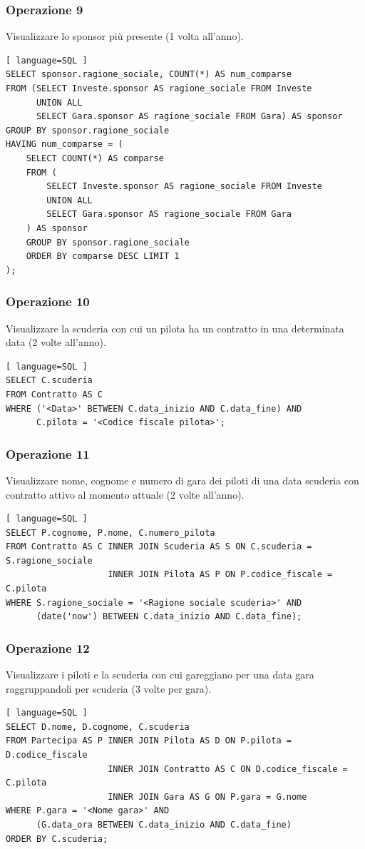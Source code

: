 \documentclass[11pt]{article}
\begin{document}
\subsubsection{Operazione 9}
Visualizzare lo sponsor più presente (1 volta all'anno).
\begin{lstlisting}[ language=SQL ]
SELECT sponsor.ragione_sociale, COUNT(*) AS num_comparse
FROM (SELECT Investe.sponsor AS ragione_sociale FROM Investe 
      UNION ALL 
      SELECT Gara.sponsor AS ragione_sociale FROM Gara) AS sponsor
GROUP BY sponsor.ragione_sociale
HAVING num_comparse = (
    SELECT COUNT(*) AS comparse
    FROM (
        SELECT Investe.sponsor AS ragione_sociale FROM Investe 
        UNION ALL 
        SELECT Gara.sponsor AS ragione_sociale FROM Gara
    ) AS sponsor
    GROUP BY sponsor.ragione_sociale
    ORDER BY comparse DESC LIMIT 1
);
\end{lstlisting}


\subsubsection{Operazione 10}
Visualizzare la scuderia con cui un pilota ha un contratto in una determinata data (2 volte all'anno).
\begin{lstlisting}[ language=SQL ]
SELECT C.scuderia
FROM Contratto AS C
WHERE ('<Data>' BETWEEN C.data_inizio AND C.data_fine) AND
      C.pilota = '<Codice fiscale pilota>';
\end{lstlisting}


\subsubsection{Operazione 11}
Visualizzare nome, cognome e numero di gara dei piloti di una data scuderia con contratto attivo al momento attuale (2 volte all'anno).
\begin{lstlisting}[ language=SQL ]
SELECT P.cognome, P.nome, C.numero_pilota
FROM Contratto AS C INNER JOIN Scuderia AS S ON C.scuderia = S.ragione_sociale 
                    INNER JOIN Pilota AS P ON P.codice_fiscale = C.pilota
WHERE S.ragione_sociale = '<Ragione sociale scuderia>' AND
      (date('now') BETWEEN C.data_inizio AND C.data_fine);
\end{lstlisting}


\subsubsection{Operazione 12}
Visualizzare i piloti e la scuderia con cui gareggiano per una data gara raggruppandoli per scuderia (3 volte per gara).
\begin{lstlisting}[ language=SQL ]
SELECT D.nome, D.cognome, C.scuderia
FROM Partecipa AS P INNER JOIN Pilota AS D ON P.pilota = D.codice_fiscale
                    INNER JOIN Contratto AS C ON D.codice_fiscale = C.pilota
                    INNER JOIN Gara AS G ON P.gara = G.nome
WHERE P.gara = '<Nome gara>' AND
      (G.data_ora BETWEEN C.data_inizio AND C.data_fine)
ORDER BY C.scuderia;
\end{lstlisting}
\end{document}
